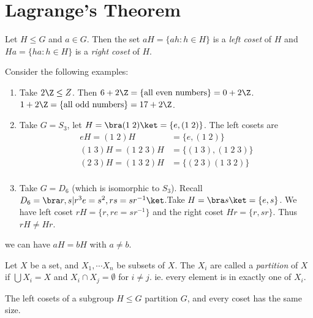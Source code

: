 \documentclass[a4paper]{article}
\begin{document}
  \section{Lagrange's Theorem}
  \begin{defi}[Cosets]
    Let $H\leq G$ and $a\in G$. Then the set $aH =\{ah : h\in H\}$ is a \emph{left coset} of $H$  and $Ha = \{ha : h\in H\}$ is a \emph{right coset} of $H$.
  \end{defi}
  \begin{eg}
    Consider the following examples: 
    \begin{enumerate}
      \item Take $2\Z \leq Z$. Then $6 + 2\Z = \{\text{all even numbers}\} = 0 + 2\Z$. $1 + 2\Z = \{\text{all odd numbers}\} = 17 + 2\Z$. 
      \item Take $G = S_3$, let $H = \bra (1\; 2)\ket = \{e, (1\; 2)\}$. The left cosets are 
        \begin{align*}
          eH = (1\; 2)H &= \{e, (1\; 2)\}\\
          (1\; 3)H = (1\; 2\; 3)H &= \{(1\; 3), (1\; 2\; 3)\}\\
          (2\; 3)H = (1\; 3\; 2)H &= \{(2\; 3)(1\; 3\; 2)\}\\
        \end{align*}
      \item Take $G = D_6$ (which is isomorphic to $S_3$). Recall $D_6 = \bra r, s | r^3 e = s^2, rs = sr^{-1}\ket$.Take $H = \bra s\ket = \{e, s\}$. We have left coset $rH = \{r, re = sr^{-1}\}$ and the right coset $Hr = \{r, sr\}$. Thus $rH \not= Hr$. 
    \end{enumerate}
  \end{eg}
  \note we can have $aH = bH$ with $a\not= b$. 

  \begin{defi}[Partition]
    Let $X$ be a set, and $X_1, \cdots X_n$ be subsets of $X$. The $X_i$ are called a \emph{partition} of $X$ if $\bigcup X_i = X$ and $X_i\cap X_j = \emptyset$ for $i\not= j$. ie. every element is in exactly one of $X_i$.
  \end{defi}

  \begin{lemma}
    The left cosets of a subgroup $H\leq G$ partition $G$, and every coset has the same size.
  \end{lemma}
\end{document}
